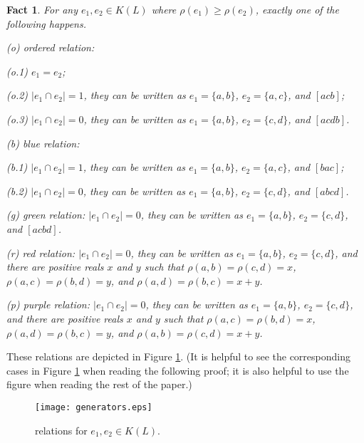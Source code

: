 \documentclass[12pt]{article}
\newtheorem{fact}{Fact}
\begin{document}
\begin{fact}\label{fact.relations}
For any $e_1, e_2 \in K(L)$ where $\rho(e_1) \ge \rho(e_2)$, exactly one of the following happens.

(o) {\em ordered relation}:

(o.1) $e_1 = e_2$;

(o.2) $|e_1 \cap e_2| = 1$, they can be written as $e_1 = \{a, b\}$, $e_2 = \{a, c\}$, and $[acb]$;

(o.3) $|e_1 \cap e_2| = 0$, they can be written as $e_1 = \{a, b\}$, $e_2 = \{c, d\}$,
and $[acdb]$.

(b) {\em blue relation}:

(b.1) $|e_1 \cap e_2| = 1$, they can be written as $e_1 = \{a, b\}$, $e_2 = \{a, c\}$,  and $[bac]$;

(b.2) $|e_1 \cap e_2| = 0$, they can be written as $e_1 = \{a, b\}$, $e_2 = \{c, d\}$,
and $[abcd]$.

(g) {\em green relation}: $|e_1 \cap e_2| = 0$, they can be written as $e_1 = \{a, b\}$, $e_2 = \{c, d\}$,
and $[acbd]$.

(r) {\em red relation}: 
$|e_1 \cap e_2| = 0$, they can be written as $e_1 = \{a, b\}$, $e_2 = \{c, d\}$, 
and there are positive reals $x$ and $y$
such that 
$\rho(a, b) = \rho(c, d)=x$,
$\rho(a, c) = \rho(b, d) = y$, and $\rho(a, d) = \rho(b, c) = x+y$.

(p) {\em purple relation}:
$|e_1 \cap e_2| = 0$, they can be written as $e_1 = \{a, b\}$, $e_2 = \{c, d\}$, 
and there are positive reals $x$ and $y$
such that 
$\rho(a, c) = \rho(b, d)=x$,
$\rho(a, d) = \rho(b, c)=y$, and $\rho(a, b) = \rho(c, d) = x+y$.
\end{fact}

These relations are depicted in Figure \ref{fig.relations}.
(It is helpful to see the corresponding cases in
Figure \ref{fig.relations} when reading the following proof;
it is also helpful to use the figure when reading the rest of the paper.)
 
\begin{figure}[h!]
\begin{center}
\texttt{[image: generators.eps]}
\caption{relations for $e_1, e_2 \in K(L)$.}
\label{fig.relations}
\end{center}
\end{figure}
\end{document}
